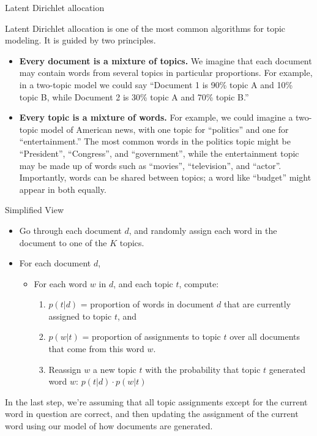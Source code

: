 \documentclass[
  ignorenonframetext,
]{beamer}
\providecommand{\tightlist}{%
  \setlength{\itemsep}{0pt}\setlength{\parskip}{0pt}}
\begin{document}
\begin{frame}{Latent Dirichlet allocation}
\protect\hypertarget{latent-dirichlet-allocation}{}

\footnotesize

Latent Dirichlet allocation is one of the most common algorithms for
topic modeling. It is guided by two principles.

\begin{itemize}
\tightlist
\item
  \textbf{Every document is a mixture of topics.} We imagine that each
  document may contain words from several topics in particular
  proportions. For example, in a two-topic model we could say ``Document
  1 is 90\% topic A and 10\% topic B, while Document 2 is 30\% topic A
  and 70\% topic B.''
\item
  \textbf{Every topic is a mixture of words.} For example, we could
  imagine a two-topic model of American news, with one topic for
  ``politics'' and one for ``entertainment.'' The most common words in
  the politics topic might be ``President'', ``Congress'', and
  ``government'', while the entertainment topic may be made up of words
  such as ``movies'', ``television'', and ``actor''. Importantly, words
  can be shared between topics; a word like ``budget'' might appear in
  both equally.
\end{itemize}

\end{frame}

\begin{frame}{Simplified View}
\protect\hypertarget{simplified-view}{}

\begin{itemize}
\item Go through each document $d$, and randomly assign each word in the document to one of the $K$ topics.
\item For each document $d$, 
   \begin{itemize}
      \item For each word $w$ in $d$, and each topic $t$, compute: 
      \begin{enumerate}
        \item $p( t |  d)$ =  proportion of words in document $d$ that are currently assigned to topic $t$, and        
        \item $p( w |  t)$ =  proportion of assignments to topic $t$ over all documents that come from this word $w$.
        \item Reassign $w$ a new topic $t$ with the probability that topic $t$ generated word $w$: $p( t |  d) \cdot p( w |  t)$
      \end{enumerate}
    \end{itemize}   
\end{itemize}

In the last step, we're assuming that all topic assignments except for
the current word in question are correct, and then updating the
assignment of the current word using our model of how documents are
generated.

\end{frame}
\end{document}
